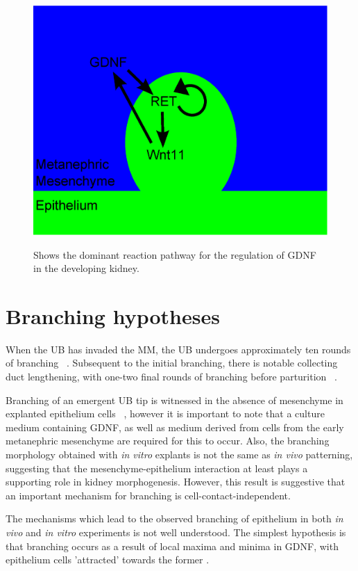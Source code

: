 \documentclass[pdftex,10pt,a4paper,twocolumn]{article}
\begin{document}
\begin{figure}[t] 
\centering
\scalebox{0.35} 
{\includegraphics{pathways.eps}}
\caption{Shows the dominant reaction pathway for the regulation of GDNF in the developing kidney.}\label{fig:pathways}
\end{figure} 

\section{Branching hypotheses}
When the UB has invaded the MM, the UB undergoes approximately ten rounds of branching ~\cite{srinivas1999expression}. Subsequent to the initial branching, there is notable collecting duct lengthening, with one-two final rounds of branching before parturition ~\cite{cebrian2004morphometric}.

Branching of an emergent UB tip is witnessed in the absence of mesenchyme in explanted epithelium cells ~\cite{qiao1999branching}, however it is important to note that a culture medium containing GDNF, as well as medium derived from cells from the early metanephric mesenchyme are required for this to occur. Also, the branching morphology obtained with \textit{in vitro} explants is not the same as \textit{in vivo} patterning, suggesting that the mesenchyme-epithelium interaction at least plays a supporting role in kidney morphogenesis. However, this result is suggestive that an important mechanism for branching is cell-contact-independent.

The mechanisms which lead to the observed branching of epithelium in both \textit{in vivo} and \textit{in vitro} experiments is not well understood. The simplest hypothesis is that branching occurs as a result of local maxima and minima in GDNF, with epithelium cells 'attracted' towards the former \cite{sariola2003novel}.
\end{document}
